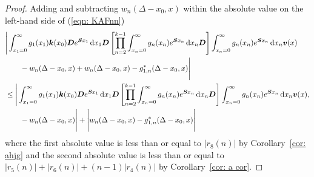 \begin{proof}
	Adding and subtracting \(w_n(\Delta-x_0,x)\) within the absolute value on the left-hand side of (\ref{eqn: KAFnn}) 
	\begin{align*}
		&\Bigg| \int_{x_1=0}^\infty g_1(x_1) \boldsymbol k(x_0) \boldsymbol D e^{\boldsymbol{S}x_1}\, \mathrm{d} x_1\boldsymbol D 
            	\left[\prod_{n=2}^{k-1}\int_{x_n=0}^\infty g_n(x_n) e^{\boldsymbol{S}x_n} \, \mathrm{d} x_n
		\boldsymbol D\right]
            	\int_{x_n=0}^\infty g_{n}(x_n) e^{\boldsymbol{S}x_n} \, \mathrm{d} x_n {\boldsymbol v}(x) \nonumber 
		\\\nonumber &{}\qquad - w_n(\Delta - x_0,x) + w_n(\Delta - x_0,x) - g_{1,n}^*(\Delta - x_0,x) \Bigg| 
		\\&\leq \Bigg| \int_{x_1=0}^\infty g_1(x_1) \boldsymbol k(x_0) \boldsymbol D e^{\boldsymbol{S}x_1}\, \mathrm{d} x_1\boldsymbol D 
            	\left[\prod_{n=2}^{k-1}\int_{x_n=0}^\infty g_n(x_n) e^{\boldsymbol{S}x_n} \, \mathrm{d} x_n
		\boldsymbol D\right]
            	\int_{x_n=0}^\infty g_{n}(x_n) e^{\boldsymbol{S}x_n} \, \mathrm{d} x_n {\boldsymbol v}(x) ,\nonumber 
	\\&\qquad - w_n(\Delta - x_0,x)\Bigg| + \Bigg| w_n(\Delta - x_0,x) - g_{1,n}^*(\Delta - x_0,x) \Bigg| 
	\end{align*}
	where the first absolute value is less than or equal to \(|r_8(n)|\) by Corollary~\ref{cor: ahjg} and the second absolute value is less than or equal to \(|r_5(n)|+|r_6(n)| + (n-1)|r_4(n)|\) by Corollary~\ref{cor: a cor}.
\end{proof}

